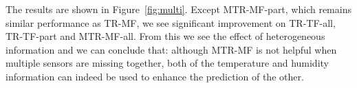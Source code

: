 The results are shown in Figure~\ref{fig:multi}.
Except MTR-MF-part, which remains similar performance as TR-MF, we see significant improvement on TR-TF-all, TR-TF-part and MTR-MF-all. 
From this we see the effect of heterogeneous information and we can conclude that:
although MTR-MF is not helpful when multiple sensors are missing together,
both of the temperature and humidity information can indeed be used to enhance the prediction of the other.
%
% 

